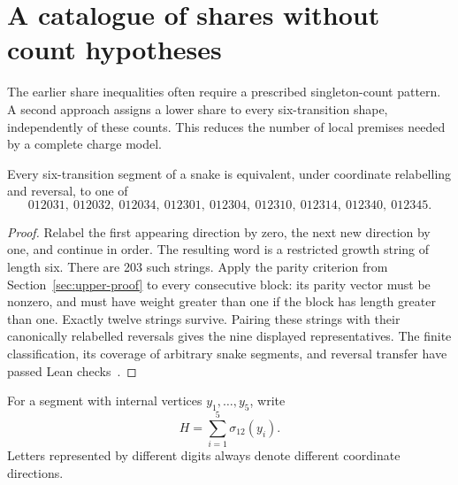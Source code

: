 \section{A catalogue of shares without count hypotheses}\label{sec:countfree-catalogue}
The earlier share inequalities often require a prescribed singleton-count pattern. A second approach assigns a lower share to every six-transition shape, independently of these counts. This reduces the number of local premises needed by a complete charge model.

\begin{lemma}\label{lem:six-shape-classification}
Every six-transition segment of a snake is equivalent, under coordinate relabelling and reversal, to one of
\[
012031,\ 012032,\ 012034,\ 012301,\ 012304,\
012310,\ 012314,\ 012340,\ 012345.
\]
\end{lemma}
\begin{proof}
Relabel the first appearing direction by zero, the next new direction by one, and continue in order. The resulting word is a restricted growth string of length six. There are 203 such strings. Apply the parity criterion from Section~\ref{sec:upper-proof} to every consecutive block: its parity vector must be nonzero, and must have weight greater than one if the block has length greater than one. Exactly twelve strings survive. Pairing these strings with their canonically relabelled reversals gives the nine displayed representatives. The finite classification, its coverage of arbitrary snake segments, and reversal transfer have passed Lean checks~\cite{countfreearchive}.
\end{proof}

For a segment with internal vertices $y_1,\ldots,y_5$, write
\[
H=\sum_{i=1}^{5}\sigma_{12}(y_i).
\]
Letters represented by different digits always denote different coordinate directions.

